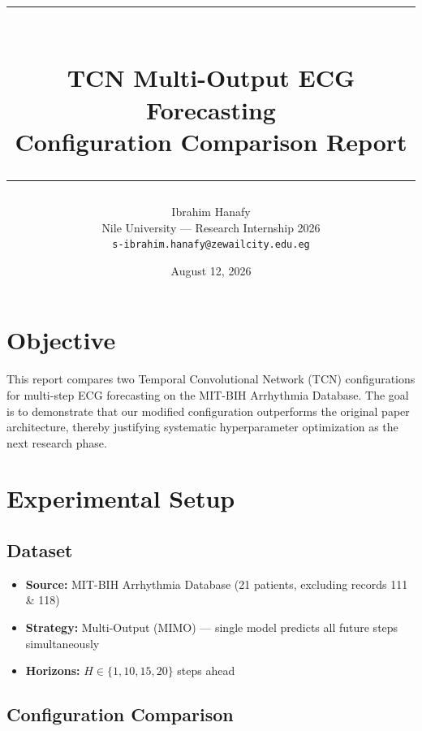 \documentclass[11pt, a4paper]{article}
\title{%
    \textcolor{nublue}{\rule{\linewidth}{1.2pt}}\\[6pt]
    \textbf{TCN Multi-Output ECG Forecasting}\\[4pt]
    Configuration Comparison Report\\[6pt]
    \textcolor{nublue}{\rule{\linewidth}{1.2pt}}
}
\author{Ibrahim Hanafy\\[2pt]
    \small Nile University --- Research Internship 2026\\
    \small \texttt{s-ibrahim.hanafy@zewailcity.edu.eg}}
\date{August 12, 2026}
\begin{document}
\maketitle

\section{Objective}

This report compares two Temporal Convolutional Network (TCN) configurations for multi-step ECG forecasting on the MIT-BIH Arrhythmia Database. The goal is to demonstrate that our modified configuration outperforms the original paper architecture, thereby justifying systematic hyperparameter optimization as the next research phase.

\section{Experimental Setup}

\subsection{Dataset}
\begin{itemize}[nosep]
    \item \textbf{Source:} MIT-BIH Arrhythmia Database (21 patients, excluding records 111 \& 118)
    \item \textbf{Strategy:} Multi-Output (MIMO) --- single model predicts all future steps simultaneously
    \item \textbf{Horizons:} $H \in \{1, 10, 15, 20\}$ steps ahead
\end{itemize}

\subsection{Configuration Comparison}
\end{document}
